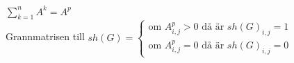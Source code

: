$\sum^n_{k=1}A^k = A^{p}$\\
Grannmatrisen till $sh(G) = 
\begin{cases}
    \text{om } A^{p}_{i,j} > 0\text{ då är } sh(G)_{i,j} = 1 \\
    \text{om } A^{p}_{i,j} = 0\text{ då är } sh(G)_{i,j} = 0
\end{cases}$
